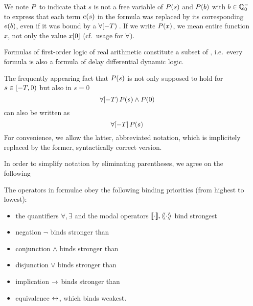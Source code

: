     We note $P$ to indicate that $s$ is not a free variable of $P(s)$ and $P(b)$ with $b\in\mathbb{Q}^-_0$ to express that each term $e(s)$ in the formula was replaced by its corresponding $e(b)$, even if it was bound by a $\forall [-T){\,}$.
    If we write $P(x)$, we mean entire function $x$, not only the value $x[0]$ (cf.\ usage for $\forall$).
    
    Formulas of first-order logic of real arithmetic constitute a subset of \ddL, i.e.\ every \FOLR formula is also a formula of delay differential dynamic logic.

    \begin{convention}
        The frequently appearing fact that $P(s)$ is not only supposed to hold for $s\in[-T,0)$ but also in $s=0$
        \begin{equation*}
            \forall [-T){\,} P(s)\land P(0)
        \end{equation*}
        can also be written as
        \begin{equation*}
            \forall [-T]{\,} P(s)
        \end{equation*}
        For convenience, we allow the latter, abbreviated notation, which is implicitely replaced by the former, syntactically correct version.
    \end{convention}

    In order to simplify notation by eliminating parentheses, we agree on the following
    \begin{convention}
        The operators in \ddL formulae obey the following binding priorities (from highest to lowest):
        \begin{itemize}
            \item the quantifiers $\forall,\exists$ and the modal operators $\dbox{\cdot}{},\ddiamond{\cdot}{}$ bind strongest
            \item negation $\lnot$ binds stronger than
            \item conjunction $\land$ binds stronger than 
            \item disjunction $\lor$ binds stronger than
            \item implication $\rightarrow$ binds stronger than
            \item equivalence $\leftrightarrow$, which binds weakest.
        \end{itemize}
    \end{convention}

